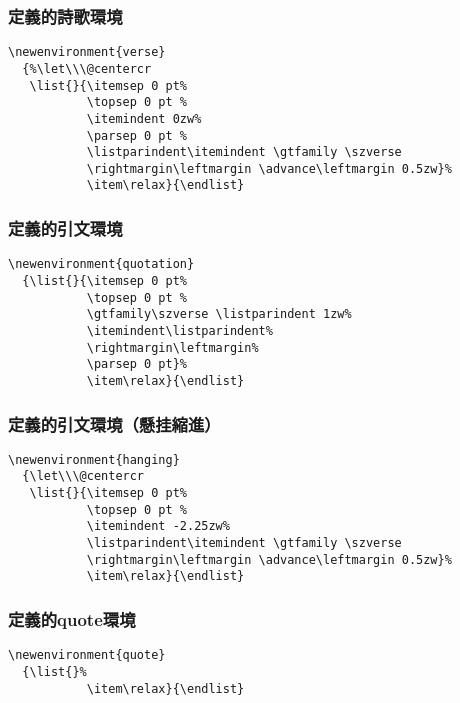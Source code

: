 \subsubsection{定義的詩歌環境}

\begin{lstlisting}[firstnumber=1136]
\newenvironment{verse}
  {%\let\\\@centercr
   \list{}{\itemsep 0 pt%
           \topsep 0 pt %
           \itemindent 0zw%
           \parsep 0 pt %
           \listparindent\itemindent \gtfamily \szverse
           \rightmargin\leftmargin \advance\leftmargin 0.5zw}%
           \item\relax}{\endlist}
\end{lstlisting}

\subsubsection{定義的引文環境}

\begin{lstlisting}[firstnumber=1146]
\newenvironment{quotation}
  {\list{}{\itemsep 0 pt%
           \topsep 0 pt %
           \gtfamily\szverse \listparindent 1zw%
           \itemindent\listparindent%
           \rightmargin\leftmargin%
           \parsep 0 pt}%
           \item\relax}{\endlist}
\end{lstlisting}

\subsubsection{定義的引文環境（懸挂縮進）}

\begin{lstlisting}[firstnumber=1156]
\newenvironment{hanging}
  {\let\\\@centercr
   \list{}{\itemsep 0 pt%
           \topsep 0 pt %
           \itemindent -2.25zw%
           \listparindent\itemindent \gtfamily \szverse
           \rightmargin\leftmargin \advance\leftmargin 0.5zw}%
           \item\relax}{\endlist}
\end{lstlisting}

\subsubsection{定義的quote環境}

\begin{lstlisting}[firstnumber=1165]
\newenvironment{quote}
  {\list{}%
           \item\relax}{\endlist}
\end{lstlisting}

